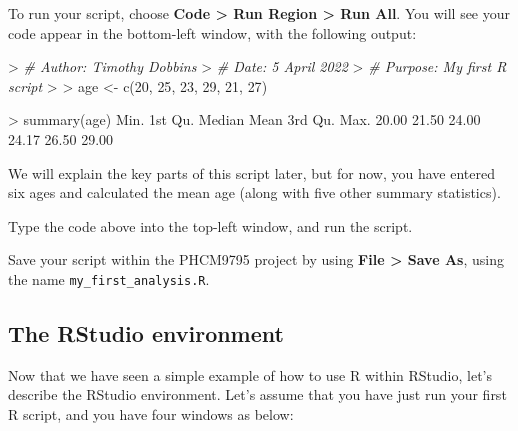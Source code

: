 \documentclass[
  a4paper,
]{memoir}
\newenvironment{Shaded}{\begin{snugshade}}{\end{snugshade}}
\newcommand{\CommentTok}[1]{\textcolor[rgb]{0.00,0.00,0.00}{\textit{#1}}}
\newcommand{\DecValTok}[1]{\textcolor[rgb]{0.00,0.00,0.00}{#1}}
\newcommand{\ErrorTok}[1]{\textcolor[rgb]{0.00,0.00,0.00}{#1}}
\newcommand{\FloatTok}[1]{\textcolor[rgb]{0.00,0.00,0.00}{#1}}
\newcommand{\FunctionTok}[1]{\textcolor[rgb]{0.00,0.00,0.00}{#1}}
\newcommand{\NormalTok}[1]{\textcolor[rgb]{0.00,0.00,0.00}{#1}}
\newcommand{\OtherTok}[1]{\textcolor[rgb]{0.00,0.00,0.00}{#1}}
\newcommand{\SpecialCharTok}[1]{\textcolor[rgb]{0.00,0.00,0.00}{#1}}
\begin{document}
To run your script, choose \textbf{Code \textgreater{} Run Region
\textgreater{} Run All}. You will see your code appear in the
bottom-left window, with the following output:

\begin{Shaded}
\begin{Highlighting}[]
\SpecialCharTok{\textgreater{}} \CommentTok{\# Author: Timothy Dobbins}
\ErrorTok{\textgreater{}} \CommentTok{\# Date: 5 April 2022}
\ErrorTok{\textgreater{}} \CommentTok{\# Purpose: My first R script}
\ErrorTok{\textgreater{}} 
\ErrorTok{\textgreater{}}\NormalTok{ age }\OtherTok{\textless{}{-}} \FunctionTok{c}\NormalTok{(}\DecValTok{20}\NormalTok{, }\DecValTok{25}\NormalTok{, }\DecValTok{23}\NormalTok{, }\DecValTok{29}\NormalTok{, }\DecValTok{21}\NormalTok{, }\DecValTok{27}\NormalTok{)}

\SpecialCharTok{\textgreater{}} \FunctionTok{summary}\NormalTok{(age)}
\NormalTok{   Min. 1st Qu.  Median    Mean 3rd Qu.    Max. }
  \FloatTok{20.00}   \FloatTok{21.50}   \FloatTok{24.00}   \FloatTok{24.17}   \FloatTok{26.50}   \FloatTok{29.00} 
\end{Highlighting}
\end{Shaded}

We will explain the key parts of this script later, but for now, you
have entered six ages and calculated the mean age (along with five other
summary statistics).

\begin{tcolorbox}[enhanced jigsaw, title={TASK}, opacitybacktitle=0.6, colbacktitle=quarto-callout-note-color!10!white, titlerule=0mm, colframe=quarto-callout-note-color-frame, opacityback=0, left=2mm, breakable, bottomtitle=1mm, coltitle=black, bottomrule=.15mm, arc=.35mm, rightrule=.15mm, toptitle=1mm, colback=white, toprule=.15mm, leftrule=.75mm]

Type the code above into the top-left window, and run the script.

Save your script within the PHCM9795 project by using \textbf{File
\textgreater{} Save As}, using the name \texttt{my\_first\_analysis.R}.

\end{tcolorbox}

\hypertarget{the-rstudio-environment}{%
\subsection{The RStudio environment}\label{the-rstudio-environment}}

Now that we have seen a simple example of how to use R within RStudio,
let's describe the RStudio environment. Let's assume that you have just
run your first R script, and you have four windows as below:
\end{document}
